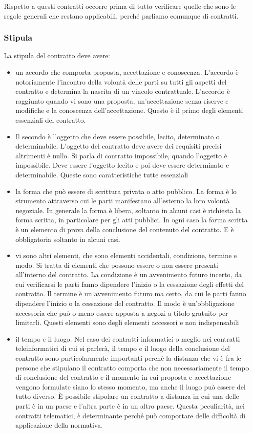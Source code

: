 Rispetto a questi contratti occorre prima di tutto verificare quelle che sono le regole generali che restano applicabili, perché parliamo comunque di contratti.

\subsubsection{Stipula}

La stipula del contratto deve avere:
\begin{itemize}
    \item un accordo che comporta proposta, accettazione e conoscenza. L'accordo è notoriamente l'incontro della volontà delle parti su tutti gli aspetti del contratto e determina la nascita di un vincolo contrattuale. L'accordo è raggiunto quando vi sono una proposta, un'accettazione senza riserve e modifiche e la conoscenza dell'accettazione. Questo è il primo degli elementi essenziali del contratto.
    \item Il secondo è l'oggetto che deve essere possibile, lecito, determinato o determinabile. L'oggetto del contratto deve avere dei requisiti precisi altrimenti è nullo. Si parla di contratto impossibile, quando l'oggetto è impossibile. Deve essere l'oggetto lecito e poi deve essere determinato e determinabile. Queste sono caratteristiche tutte essenziali
    \item la forma che può essere di scrittura privata o atto pubblico. La forma è lo strumento attraverso cui le parti manifestano all'esterno la loro volontà negoziale. In generale la forma è libera, soltanto in alcuni casi è richiesta la forma scritta, in particolare per gli atti pubblici. In ogni caso la forma scritta è un elemento di prova della conclusione del contenuto del contratto. E è obbligatoria soltanto in alcuni casi.
    \item vi sono altri elementi, che sono elementi accidentali, condizione, termine e modo. Si tratta di elementi che possono essere o non essere presenti all'interno del contratto. La condizione è un avvenimento futuro incerto, da cui verificarsi le parti fanno dipendere l'inizio o la cessazione degli effetti del contratto. Il termine è un avvenimento futuro ma certo, da cui le parti fanno dipendere l'inizio o la cessazione del contratto. Il modo è un'obbligazione accessoria che può o meno essere apposta a negozi a titolo gratuito per limitarli. Questi elementi sono degli elementi accessori e non indispensabili
    \item il tempo e il luogo. Nel caso dei contratti informatici o meglio nei contratti teleinformatici di cui si parlerà, il tempo e il luogo della conclusione del contratto sono particolarmente importanti perchè la distanza che vi è fra le persone che stipulano il contratto comporta che non necessariamente il tempo di conclusione del contratto e il momento in cui proposta e accettazione vengono formulate siano lo stesso momento, ma anche il luogo può essere del tutto diverso. È possibile stipolare un contratto a distanza in cui una delle parti è in un paese e l'altra parte è in un altro paese. Questa peculiarità, nei contratti telematici, è determinante perché può comportare delle difficoltà di applicazione della normativa.
\end{itemize}

